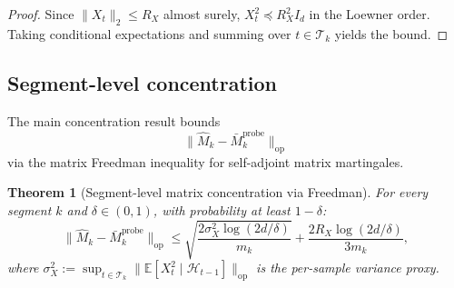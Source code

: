 \documentclass[12pt]{article}
\newcommand{\E}{\mathbb{E}}
\newcommand{\op}{\mathrm{op}}
\newcommand{\cH}{\mathcal{H}}
\newcommand{\cT}{\mathcal{T}}
\newtheorem{theorem}{Theorem}
\theoremstyle{plain}
\theoremstyle{definition}
\begin{document}
\begin{proof}
Since $\|X_t\|_2 \le R_X$ almost surely, $X_t^2 \preceq R_X^2 I_d$ in the Loewner order. Taking conditional expectations and summing over $t \in \cT_k$ yields the bound.
\end{proof}

\subsection{Segment-level concentration}

The main concentration result bounds
\[
\|\widehat{M}_k - \bar{M}_k^{\mathrm{probe}}\|_{\op}
\]
via the matrix Freedman inequality for self-adjoint matrix martingales.

\begin{theorem}[Segment-level matrix concentration via Freedman]
\label{thm:matrix_concentration}
For every segment $k$ and $\delta \in (0,1)$, with probability at least $1 - \delta$:
\[
\|\widehat{M}_k - \bar{M}_k^{\mathrm{probe}}\|_{\op} \le \sqrt{\frac{2\sigma_X^2 \log(2d/\delta)}{m_k}} + \frac{2R_X \log(2d/\delta)}{3m_k},
\]
where $\sigma_X^2 := \sup_{t \in \cT_k} \|\E[X_t^2 \mid \cH_{t-1}]\|_{\op}$ is the per-sample variance proxy.
\end{theorem}
\end{document}
